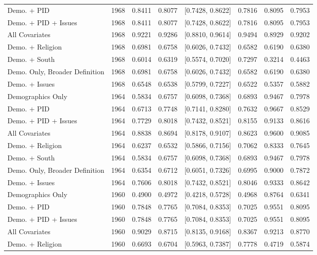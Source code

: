 \begin{longtable}{lrrrlrrr}
  Demo. + PID & 1968 & 0.8411 & 0.8077 & [0.7428, 0.8622] & 0.7816 & 0.8095 & 0.7953 \\ 
  Demo. + PID + Issues & 1968 & 0.8411 & 0.8077 & [0.7428, 0.8622] & 0.7816 & 0.8095 & 0.7953 \\ 
  All Covariates & 1968 & 0.9221 & 0.9286 & [0.8810, 0.9614] & 0.9494 & 0.8929 & 0.9202 \\ 
  Demo. + Religion & 1968 & 0.6981 & 0.6758 & [0.6026, 0.7432] & 0.6582 & 0.6190 & 0.6380 \\ 
  Demo. + South & 1968 & 0.6014 & 0.6319 & [0.5574, 0.7020] & 0.7297 & 0.3214 & 0.4463 \\ 
  Demo. Only, Broader Definition & 1968 & 0.6981 & 0.6758 & [0.6026, 0.7432] & 0.6582 & 0.6190 & 0.6380 \\ 
  Demo. + Issues & 1968 & 0.6548 & 0.6538 & [0.5799, 0.7227] & 0.6522 & 0.5357 & 0.5882 \\ 
  Demographics Only & 1964 & 0.5834 & 0.6757 & [0.6098, 0.7368] & 0.6893 & 0.9467 & 0.7978 \\ 
  Demo. + PID & 1964 & 0.6713 & 0.7748 & [0.7141, 0.8280] & 0.7632 & 0.9667 & 0.8529 \\ 
  Demo. + PID + Issues & 1964 & 0.7729 & 0.8018 & [0.7432, 0.8521] & 0.8155 & 0.9133 & 0.8616 \\ 
  All Covariates & 1964 & 0.8838 & 0.8694 & [0.8178, 0.9107] & 0.8623 & 0.9600 & 0.9085 \\ 
  Demo. + Religion & 1964 & 0.6237 & 0.6532 & [0.5866, 0.7156] & 0.7062 & 0.8333 & 0.7645 \\ 
  Demo. + South & 1964 & 0.5834 & 0.6757 & [0.6098, 0.7368] & 0.6893 & 0.9467 & 0.7978 \\ 
  Demo. Only, Broader Definition & 1964 & 0.6354 & 0.6712 & [0.6051, 0.7326] & 0.6995 & 0.9000 & 0.7872 \\ 
  Demo. + Issues & 1964 & 0.7606 & 0.8018 & [0.7432, 0.8521] & 0.8046 & 0.9333 & 0.8642 \\ 
  Demographics Only & 1960 & 0.4900 & 0.4972 & [0.4218, 0.5728] & 0.4968 & 0.8764 & 0.6341 \\ 
  Demo. + PID & 1960 & 0.7848 & 0.7765 & [0.7084, 0.8353] & 0.7025 & 0.9551 & 0.8095 \\ 
  Demo. + PID + Issues & 1960 & 0.7848 & 0.7765 & [0.7084, 0.8353] & 0.7025 & 0.9551 & 0.8095 \\ 
  All Covariates & 1960 & 0.9029 & 0.8715 & [0.8135, 0.9168] & 0.8367 & 0.9213 & 0.8770 \\ 
  Demo. + Religion & 1960 & 0.6693 & 0.6704 & [0.5963, 0.7387] & 0.7778 & 0.4719 & 0.5874 \\ 

\end{longtable}
